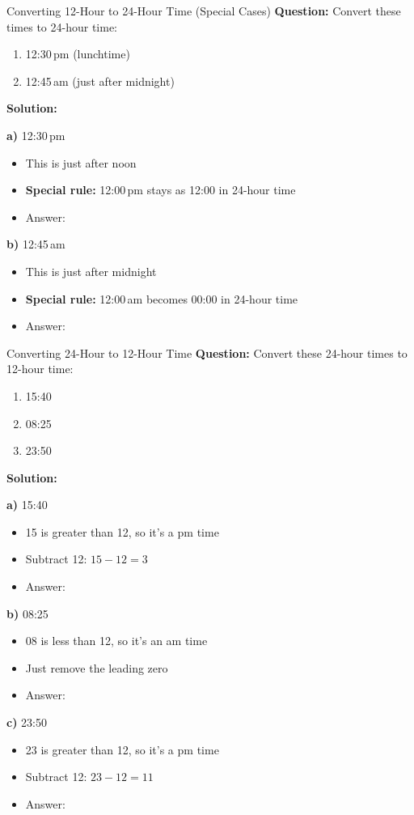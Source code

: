 \documentclass[12pt,a4paper]{article}
\begin{document}
\begin{examplebox}{Converting 12-Hour to 24-Hour Time (Special Cases)}
\textbf{Question:} Convert these times to 24-hour time:
\begin{enumerate}[label=\alph*)]
\item 12:30\,pm (lunchtime)
\item 12:45\,am (just after midnight)
\end{enumerate}

\textbf{Solution:}

\textbf{a)} 12:30\,pm
\begin{itemize}
\item This is just after noon
\item \textbf{Special rule:} 12:00\,pm stays as 12:00 in 24-hour time
\item Answer: 
\end{itemize}

\textbf{b)} 12:45\,am
\begin{itemize}
\item This is just after midnight
\item \textbf{Special rule:} 12:00\,am becomes 00:00 in 24-hour time
\item Answer: 
\end{itemize}
\end{examplebox}

\begin{examplebox}{Converting 24-Hour to 12-Hour Time}
\textbf{Question:} Convert these 24-hour times to 12-hour time:
\begin{enumerate}[label=\alph*)]
\item 15:40
\item 08:25
\item 23:50
\end{enumerate}

\textbf{Solution:}

\textbf{a)} 15:40
\begin{itemize}
\item 15 is greater than 12, so it's a pm time
\item Subtract 12: $15 - 12 = 3$
\item Answer: 
\end{itemize}

\textbf{b)} 08:25
\begin{itemize}
\item 08 is less than 12, so it's an am time
\item Just remove the leading zero
\item Answer: 
\end{itemize}

\textbf{c)} 23:50
\begin{itemize}
\item 23 is greater than 12, so it's a pm time
\item Subtract 12: $23 - 12 = 11$
\item Answer: 
\end{itemize}
\end{examplebox}
\end{document}
